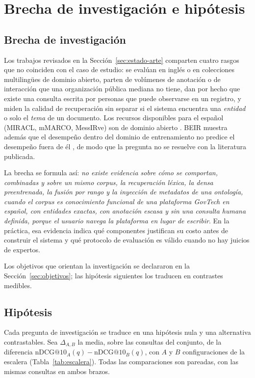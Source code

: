 \documentclass[11pt,letterpaper]{article}
\numberwithin{equation}{section}
\begin{document}
\section{Brecha de investigación e hipótesis}
\label{sec:brecha}

\subsection{Brecha de investigación}
Los trabajos revisados en la Sección~\ref{sec:estado-arte} comparten cuatro rasgos que no coinciden con el caso de estudio: se evalúan en inglés o en colecciones multilingües de dominio abierto, parten de volúmenes de anotación o de interacción que una organización pública mediana no tiene, dan por hecho que existe una consulta escrita por personas que puede observarse en un registro, y miden la calidad de recuperación sin separar si el sistema encuentra una \emph{entidad} o solo el \emph{tema} de un documento. Los recursos disponibles para el español (MIRACL, mMARCO, MessIRve) son de dominio abierto \cite{zhang2023miracl,bonifacio2021mmarco,valentini2025messirve}. BEIR muestra además que el desempeño dentro del dominio de entrenamiento no predice el desempeño fuera de él \cite{thakur2021beir}, de modo que la pregunta no se resuelve con la literatura publicada.

La brecha se formula así: \emph{no existe evidencia sobre cómo se comportan, combinadas y sobre un mismo corpus, la recuperación léxica, la densa preentrenada, la fusión por rango y la inyección de metadatos de una ontología, cuando el corpus es conocimiento funcional de una plataforma GovTech en español, con entidades exactas, con anotación escasa y sin una consulta humana definida, porque el usuario navega la plataforma en lugar de escribir}. En la práctica, esa evidencia indica qué componentes justifican su costo antes de construir el sistema y qué protocolo de evaluación es válido cuando no hay juicios de expertos.

Los objetivos que orientan la investigación se declararon en la Sección~\ref{sec:objetivos}; las hipótesis siguientes los traducen en contrastes medibles.

\subsection{Hipótesis}
\label{sec:hipotesis}
Cada pregunta de investigación se traduce en una hipótesis nula y una alternativa contrastables. Sea $\Delta_{A,B}$ la media, sobre las consultas del conjunto, de la diferencia $\mathrm{nDCG@10}_A(q)-\mathrm{nDCG@10}_B(q)$, con $A$ y $B$ configuraciones de la escalera (Tabla~\ref{tab:escalera}). Todas las comparaciones son pareadas, con las mismas consultas en ambos brazos.
\end{document}
